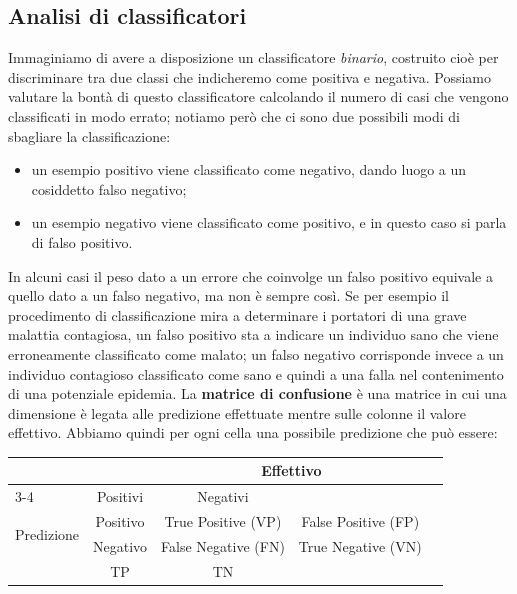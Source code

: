 \subsection{Analisi di classificatori}
Immaginiamo di avere a disposizione un classificatore \textit{binario}, costruito cioè per discriminare tra due classi che indicheremo come positiva e negativa. Possiamo valutare la bontà di questo classificatore calcolando il numero di casi che vengono classificati in modo errato; notiamo però che ci sono due possibili modi di sbagliare la classificazione:
\begin{itemize}
    \item un esempio positivo viene classificato come negativo, dando luogo a un cosiddetto falso negativo;
    \item un esempio negativo viene classificato come positivo, e in questo caso si parla di falso positivo.
\end{itemize}
In alcuni casi il peso dato a un errore che coinvolge un falso positivo equivale a quello dato a un falso negativo, ma non è sempre così. Se per esempio il procedimento di classificazione mira a determinare i portatori di una grave malattia contagiosa, un falso positivo sta a indicare un individuo sano che viene erroneamente classificato come malato; un falso negativo corrisponde invece a un individuo contagioso classificato come sano e quindi a una falla nel contenimento di una potenziale epidemia.
\newline \newline
La \textbf{matrice di confusione} è una matrice in cui una dimensione è legata alle predizione effettuate mentre sulle colonne il valore effettivo. Abbiamo quindi per ogni cella una possibile predizione che può essere:

\begin{center}
\begin{tabular}{ | m{3cm} | c | c | c | c | } 
    \hline
    \multicolumn{2}{|c|}{} & \multicolumn{2}{|c|}{Effettivo} \\
    \cline{3-4}
    \multicolumn{2}{|c|} {}
    & Positivi & Negativi\\
    \hline
    \multirow{2}{*}{Predizione}
    & Positivo & True Positive (VP) & False Positive (FP) \\
    \cline{2-4}
    & Negativo & False Negative (FN) & True Negative (VN) \\
    \hline
    \rowcolor{green!50}
    \multicolumn{2}{| c |}{Totals}
    & TP & TN \\
    \hline
\end{tabular}
\end{center}

